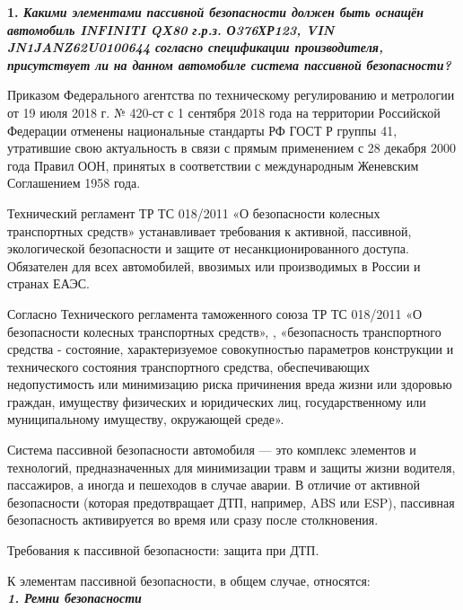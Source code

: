 \textbf{1. \textsl{Какими элементами пассивной безопасности должен быть оснащён автомобиль INFINITI QX80 г.р.з. О376ХР123, VIN JN1JANZ62U0100644 согласно спецификации производителя, присутствует ли на данном автомобиле система пассивной безопасности?}}
\par
Приказом Федерального агентства по техническому регулированию и метрологии от 19 июля 2018 г. № 420-ст с 1 сентября 2018 года на территории Российской Федерации отменены национальные стандарты РФ ГОСТ Р группы 41, утратившие свою актуальность в связи с прямым применением с 28 декабря 2000 года Правил ООН, принятых в соответствии с международным Женевским Соглашением 1958 года.
\par
Технический регламент ТР ТС 018/2011 «О безопасности колесных транспортных средств» устанавливает требования к активной, пассивной, экологической безопасности и защите от несанкционированного доступа. Обязателен для всех автомобилей, ввозимых или производимых в России и странах ЕАЭС.
\par
Согласно Технического регламента таможенного союза ТР ТС 018/2011 «О безопасности колесных транспортных средств», \cite[п. 6]{0182011:tr},  «безопасность транспортного средства - состояние, характеризуемое совокупностью параметров конструкции и технического состояния транспортного средства, обеспечивающих недопустимость или минимизацию риска причинения вреда жизни или здоровью граждан, имуществу физических и юридических лиц, государственному или муниципальному имуществу, окружающей среде».  

Система пассивной безопасности автомобиля — это комплекс элементов и технологий, предназначенных для минимизации травм и защиты жизни водителя, пассажиров, а иногда и пешеходов в случае аварии. В отличие от активной безопасности (которая предотвращает ДТП, например, ABS или ESP), пассивная безопасность активируется во время или сразу после столкновения. 


Требования к пассивной безопасности: защита  при ДТП.

%
%
%
%
%

К элементам пассивной безопасности, в общем случае, относятся:\\
\textsl{{\textbf{1. Ремни безопасности}}}

